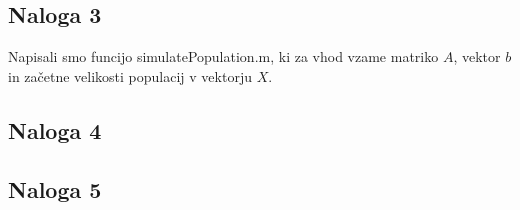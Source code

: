 \documentclass[a4paper, 12pt]{article}
\begin{document}
\subsection{Naloga 3}
Napisali smo funcijo {\sf simulatePopulation.m}, ki za vhod vzame matriko $ A $, vektor $ b $ in začetne
velikosti populacij v vektorju $ X $.

\subsection{Naloga 4}

\subsection{Naloga 5}
\end{document}
